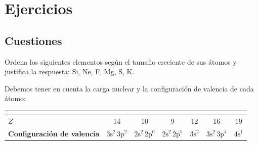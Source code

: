 \setcounter{cuestion}{0}
\setcounter{ejerciciogeneral}{0}
\setcounter{ejercicionumero}{0}



\section{Ejercicios}

\subsection{Cuestiones}

\begin{question}
    Ordena los siguientes elementos según el tamaño creciente
    de sus átomos y justifica la respuesta: Si, Ne, F, Mg, S, K.

    \begin{solu}
        Debemos tener en cuenta la carga nuclear y la configuración
        de valencia de cada átomo:


        \begin{center}
            \begin{tabular}{@{}L{2.9cm} c c c c c c@{}}
                \toprule
                 & \textbf{} & \textbf{} & \textbf{} & \textbf{} & \textbf{} & \textbf{} \\
                \midrule
                \textbf{\(Z\)} & 14 & 10 & 9 & 12 & 16 & 19 \\[3pt]
                \textbf{Configuración de valencia} & \(\mathrm{3s^2\,3p^2}\) & \(\mathrm{2s^2\,2p^6}\) & \(\mathrm{2s^2\,2p^5}\) & \(\mathrm{3s^2}\) & \(\mathrm{3s^2\,3p^4}\) & \(\mathrm{4s^1}\) \\
                \bottomrule
            \end{tabular}
        \end{center}


\end{solu}
\end{question}
